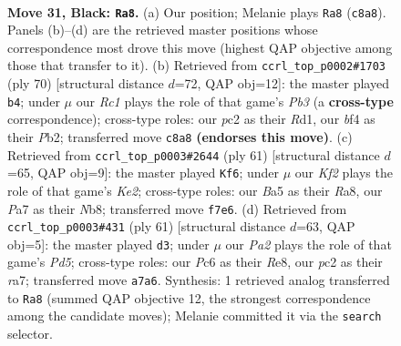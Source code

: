 \documentclass[11pt]{article}
\begin{document}
\clearpage

\begin{figure}[p]\centering
\begin{subfigure}{0.46\textwidth}\centering
\resizebox{\linewidth}{!}{%
\newchessgame
\chessboard[
  setfen={2r3nr/p4k1p/2p5/b7/5B2/P2B3P/1PP2KP1/RR6 b - - 0 31},
  showmover=false,
  pgfstyle=straightmove, color=movearrow, markmove={c8-a8}
]}
\caption{}
\end{subfigure}\hfill
\begin{subfigure}{0.46\textwidth}\centering
\resizebox{\linewidth}{!}{%
\newchessgame
\chessboard[
  setfen={3R4/5pk1/2r5/1pr4p/8/PP1Bp3/1P3bPP/1K1R4 w - - 8 36},
  showmover=false,
  pgfstyle=straightmove, color=movearrow, markmove={b3-b4}
]}
\caption{}
\end{subfigure}
\\[4pt]
\begin{subfigure}{0.46\textwidth}\centering
\resizebox{\linewidth}{!}{%
\newchessgame
\chessboard[
  setfen={rn5r/4kp2/6pp/3Rp3/2B5/2R2P2/PP5P/6K1 b - - 2 31},
  showmover=false,
  pgfstyle=straightmove, color=movearrow, markmove={e7-f6}
]}
\caption{}
\end{subfigure}\hfill
\begin{subfigure}{0.46\textwidth}\centering
\resizebox{\linewidth}{!}{%
\newchessgame
\chessboard[
  setfen={3rr1k1/RR3p2/7p/3n4/2Bpp3/6P1/1P3P1P/6K1 b - - 1 31},
  showmover=false,
  pgfstyle=straightmove, color=movearrow, markmove={d4-d3}
]}
\caption{}
\end{subfigure}
\caption{\textbf{Move 31, Black: \texttt{Ra8}.} (a) Our position; Melanie plays \texttt{Ra8} (\texttt{c8a8}). Panels (b)--(d) are the retrieved master positions whose correspondence most drove this move (highest QAP objective among those that transfer to it). (b) Retrieved from \texttt{ccrl\_top\_p0002\#1703} (ply 70) [structural distance $d$=72, QAP obj=12]: the master played \texttt{b4}; under $\mu$ our \emph{Rc1} plays the role of that game's \emph{Pb3} (a \textbf{cross-type} correspondence); cross-type roles: our \emph{p}c2 as their \emph{R}d1, our \emph{b}f4 as their \emph{P}b2; transferred move \texttt{c8a8} \textbf{(endorses this move)}. (c) Retrieved from \texttt{ccrl\_top\_p0003\#2644} (ply 61) [structural distance $d$=65, QAP obj=9]: the master played \texttt{Kf6}; under $\mu$ our \emph{Kf2} plays the role of that game's \emph{Ke2}; cross-type roles: our \emph{B}a5 as their \emph{R}a8, our \emph{P}a7 as their \emph{N}b8; transferred move \texttt{f7e6}. (d) Retrieved from \texttt{ccrl\_top\_p0003\#431} (ply 61) [structural distance $d$=63, QAP obj=5]: the master played \texttt{d3}; under $\mu$ our \emph{Pa2} plays the role of that game's \emph{Pd5}; cross-type roles: our \emph{P}c6 as their \emph{R}e8, our \emph{p}c2 as their \emph{r}a7; transferred move \texttt{a7a6}. Synthesis: 1 retrieved analog transferred to \texttt{Ra8} (summed QAP objective 12, the strongest correspondence among the candidate moves); Melanie committed it via the \texttt{search} selector.}
\label{fig:thought-m61}
\end{figure}
\end{document}
